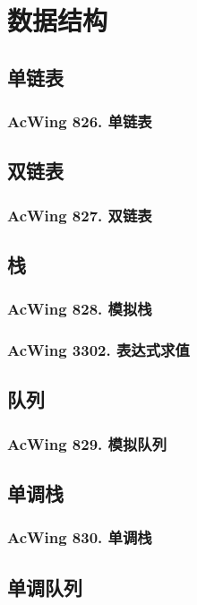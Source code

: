\chapter{数据结构}

\section{单链表}
\subsection{AcWing 826. 单链表}


\section{双链表}

\subsection{AcWing 827. 双链表}


\section{栈}
\subsection{AcWing 828. 模拟栈}
\subsection{AcWing 3302. 表达式求值}

\section{队列}
\subsection{AcWing 829. 模拟队列}

\section{单调栈}

\subsection{AcWing 830. 单调栈}

\section{单调队列}

